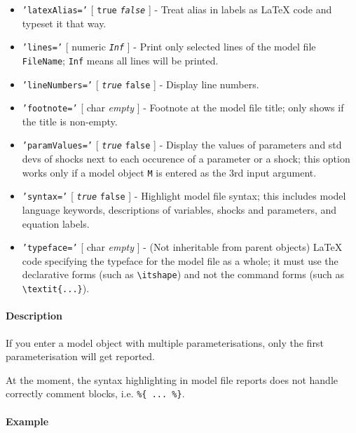  \begin{itemize}
 \item
   \texttt{'latexAlias='} {[} \texttt{true} \textbar{}
   \emph{\texttt{false}} {]} - Treat alias in labels as LaTeX code and
   typeset it that way.
 \item
   \texttt{'lines='} {[} numeric \textbar{} \emph{\texttt{Inf}} {]} -
   Print only selected lines of the model file \texttt{FileName};
   \texttt{Inf} means all lines will be printed.
 \item
   \texttt{'lineNumbers='} {[} \emph{\texttt{true}} \textbar{}
   \texttt{false} {]} - Display line numbers.
 \item
   \texttt{'footnote='} {[} char \textbar{} \emph{empty} {]} - Footnote
   at the model file title; only shows if the title is non-empty.
 \item
   \texttt{'paramValues='} {[} \emph{\texttt{true}} \textbar{}
   \texttt{false} {]} - Display the values of parameters and std devs of
   shocks next to each occurence of a parameter or a shock; this option
   works only if a model object \texttt{M} is entered as the 3rd input
   argument.
 \item
   \texttt{'syntax='} {[} \emph{\texttt{true}} \textbar{} \texttt{false}
   {]} - Highlight model file syntax; this includes model language
   keywords, descriptions of variables, shocks and parameters, and
   equation labels.
 \item
   \texttt{'typeface='} {[} char \textbar{} \emph{empty} {]} - (Not
   inheritable from parent objects) LaTeX code specifying the typeface
   for the model file as a whole; it must use the declarative forms (such
   as \texttt{\textbackslash{}itshape}) and not the command forms (such
   as \texttt{\textbackslash{}textit\{...\}}).
 \end{itemize}
 
 \paragraph{Description}
 
 If you enter a model object with multiple parameterisations, only the
 first parameterisation will get reported.
 
 At the moment, the syntax highlighting in model file reports does not
 handle correctly comment blocks, i.e. \texttt{\%\{ ... \%\}}.
 
 \paragraph{Example}


